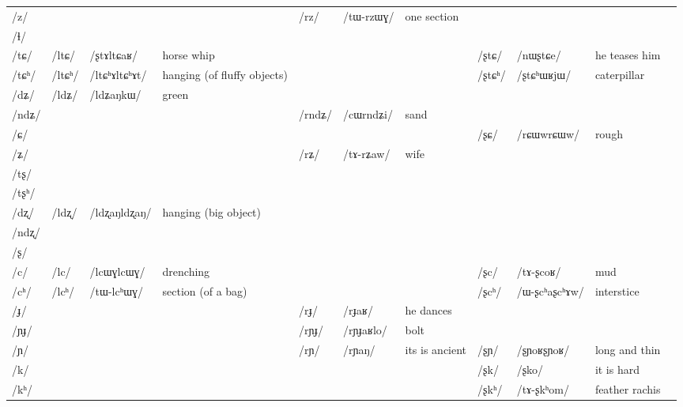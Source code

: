 \documentclass[oldfontcommands,oneside,a4paper,11pt]{article}
\newcommand{\ipa}[1]{\mbox{/#1/}} %
\newcommand{\deux}[1]{/#1/}
\newcommand{\tib}[1]{\cellcolor{lightgray}\textbf{#1}}
\newcommand{\idph}[1]{\cellcolor{gray}\textbf{#1}}
\begin{document}
\begin{landscape}
\begin{table}[H]
{\begin{tabular}{l|lll|lll|lll|l}
\ipa{z}  & 	  & 	  & 	  & 	 \deux{rz}  & 	 \ipa{tɯ-rzɯɣ}  & 	 one section & 	 & 	 & 	 & 	\\	
\ipa{ɬ}  & 	  & 	  & 	  & 	  & 	  & 	  & 	 & 	 & 	 & 	\\	
\ipa{tɕ}  & 	 \deux{ltɕ}  & 	 \ipa{ʂtɤltɕaʁ}  & 	 horse whip  & 	 & 	 & 	 & 	 \deux{ʂtɕ}  & 	 \ipa{nɯʂtɕe}  & 	he teases him  & 	\\	
\ipa{tɕʰ}  & 	 \deux{ltɕʰ} \idph{}  & 	 \ipa{ltɕʰɤltɕʰɤt}  & 	hanging (of fluffy objects)  & 	 & 	 & 	 & 	 \deux{ʂtɕʰ}  & 	 \ipa{ʂtɕʰɯʁjɯ}  & 	caterpillar  & 	\\	
\ipa{dʑ}  & 	 \deux{ldʑ} \tib{}  & 	 \ipa{ldʑaŋkɯ}  & 	 green & 	  & 	  & 	  & 	 & 	 & 	 & 	\\	
\ipa{ndʑ}  & 	  & 	  & 	  & 	 \deux{rndʑ}  & 	 \ipa{cɯrndʑi}  & 	sand  & 	 & 	 & 	 & 	\\	
\ipa{ɕ}  & 	  & 	  & 	  & 	 & 	 & 	 & 	 \deux{ʂɕ}  & 	 \ipa{rɕɯwrɕɯw}  & 	rough & 	\\	
\ipa{ʑ}  & 	  & 	  & 	  & 	 \deux{rʑ}  & 	 \ipa{tɤ-rʑaw}  & 	wife  & 	 & 	 & 	 & 	\\	
\ipa{tʂ}  & 	  & 	  & 	  & 	  & 	  & 	  & 	 & 	 & 	 & 	\\	
\ipa{tʂʰ}  & 	  & 	  & 	  & 	  & 	  & 	  & 	 & 	 & 	 & 	\\	
\ipa{dʐ}  & 	 \deux{ldʐ} \idph{}  & 	 \ipa{ldʐaŋldʐaŋ}  & 	 hanging (big object) & 	  & 	  & 	  & 	 & 	 & 	 & 	\\	
\ipa{ndʐ}  & 	  & 	  & 	  & 	  & 	  & 	  & 	 & 	 & 	 & 	\\	
\ipa{ʂ}  & 	  & 	  & 	  & 	  & 	  & 	  & 	 & 	 & 	 & 	\\	
\ipa{c}  & 	 \deux{lc} \idph{} & 	 \ipa{lcɯɣlcɯɣ}  & 	 drenching & 	 & 	 & 	 & 	 \deux{ʂc}  & 	 \ipa{tɤ-ʂcoʁ}  & 	 mud & 	\\	
\ipa{cʰ}  & 	 \deux{lcʰ}  & 	 \ipa{tɯ-lcʰɯɣ}  & 	 section (of a bag) & 	 & 	 & 	 & 	 \deux{ʂcʰ}  & 	 \ipa{ɯ-ʂcʰaʂcʰɤw}  & 	 interstice & 	\\	
\ipa{ɟ}  & 	  & 	  & 	  & 	 \deux{rɟ}  & 	 \ipa{rɟaʁ}  & 	he dances  & 	 & 	 & 	 & 	\\	
\ipa{ɲɟ}  & 	  & 	  & 	  & 	 \deux{rɲɟ}  & 	 \ipa{rɲɟaʁlo}  & 	 bolt & 	 & 	 & 	 & 	\\	
\ipa{ɲ}  & 	  & 	  & 	  & 	 \deux{rɲ}  & 	 \ipa{rɲaŋ}  & 	 its is ancient & 	 \deux{ʂɲ} \idph{}  & 	\ipa{ʂɲoʁʂɲoʁ} & 	long and thin & 	\\	
\ipa{k}  & 	  & 	  & 	  & 	 & 	 & 	 & 	 \deux{ʂk}  & 	 \ipa{ʂko}  & 	 it is hard & 	\\	
\ipa{kʰ}  & 	  & 	  & 	  & 	 & 	 & 	 & 	 \deux{ʂkʰ}  & 	 \ipa{tɤ-ʂkʰom}  & 	 feather rachis & 	\\	

\end{tabular}}
\end{table}
\end{landscape}
\end{document}
